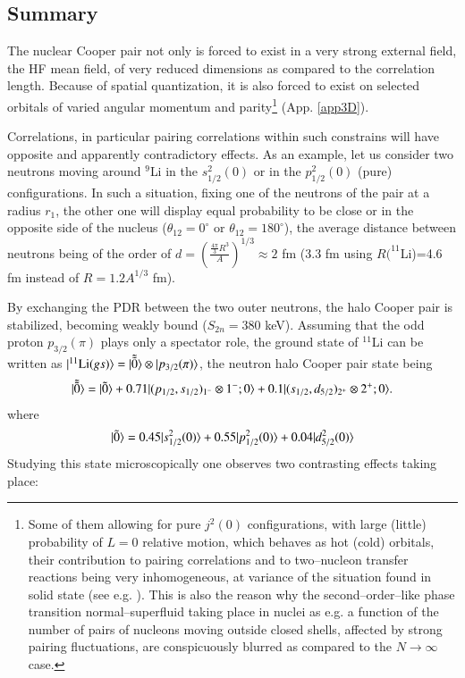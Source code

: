 \begin{subappendices}
\subsection[Summary]{Summary}
 The nuclear Cooper pair not only is forced to exist in a very strong external field, the HF mean field, of very reduced dimensions as compared to the correlation length. Because of spatial quantization, it is also forced to exist on selected orbitals of varied angular momentum and parity\footnote{Some of them allowing for pure $j^2(0)$ configurations, with large (little) probability of $L=0$ relative motion, which behaves as hot (cold) orbitals, their contribution to pairing correlations and to two--nucleon transfer reactions being very inhomogeneous, at variance of the situation found in solid state (see e.g. \cite{Broglia:05}). This is also the reason why the second--order--like phase transition normal--superfluid taking place in nuclei as e.g. a function of the number of pairs of nucleons moving outside closed shells, affected by strong pairing fluctuations, are conspicuously blurred as compared to the $N\rightarrow\infty$ case.} (App. \ref{app3D}).
 
 
 Correlations, in particular pairing correlations within such constrains will have opposite and apparently contradictory effects. As an example, let us consider two neutrons moving around $^9$Li in the $s^2_{1/2}(0)$ or in the   $p^2_{1/2}(0)$ (pure)  configurations. In such a situation, fixing one of the neutrons of the pair at a radius $r_1$, the other one will display equal probability to be close or in the opposite side of the nucleus ($\theta_{12}=0^\circ$ or $\theta_{12}=180^\circ$), the average distance between neutrons being of the order of $d=\left(\frac{\frac{4\pi}{3}R^3}{A}\right)^{1/3}\approx 2$ fm (3.3 fm using $R(^{11}$Li)=4.6 fm instead of $R=1.2 A^{1/3}$ fm).
 
 By exchanging the PDR between the two outer neutrons, the halo Cooper pair is stabilized, becoming weakly bound ($S_{2n}=380$ keV). Assuming that the odd proton $p_{3/2}(\pi)$ plays only a spectator role, the ground state of $^{11}$Li can be written as $|{^{11}\text{Li}(gs)} \rangle=|{\tilde{\tilde 0}} \rangle\otimes|{p_{3/2}(\pi)} \rangle$, the neutron halo Cooper pair state being
    \begin{align}
|{\tilde{\tilde 0}} \rangle=|{\tilde 0} \rangle+0.71|{(p_{1/2},s_{1/2})_{1^-}\otimes 1^{-};0} \rangle+0.1|{(s_{1/2},d_{5/2})_{2^+}\otimes 2^{+};0} \rangle.
    \end{align}
    where
        \begin{align}\label{eq3.B.27}
        |{\tilde 0} \rangle= 0.45|{s^2_{1/2}(0)} \rangle+0.55|{p^2_{1/2}(0)} \rangle+0.04|{d^2_{5/2}(0)} \rangle
        \end{align}
    Studying this state microscopically one observes two contrasting effects taking place:
    

\end{subappendices}
